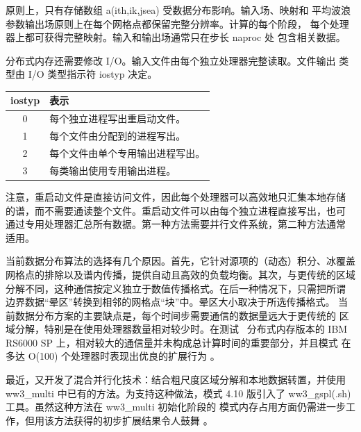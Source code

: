 


原则上，只有存储数组 {\F a(ith,ik,jsea)} 受数据分布影响。输入场、映射和
平均波浪参数输出场原则上在每个网格点都保留完整分辨率。计算的每个阶段，
每个处理器上都可获得完整映射。输入和输出场通常只在步长 {\F naproc} 处
包含相关数据。

分布式内存还需要修改 I/O。输入文件由每个独立处理器完整读取。文件输出
类型由 I/O 类型指示符 {\F iostyp} 决定。

\begin{center} \begin{tabular}{cl}
{\F iostyp} & 表示 \\ \hline
  0 & 每个独立进程写出重启动文件。 \\
  1 & 每个文件由分配到的进程写出。 \\
  2 & 每个文件由单个专用输出进程写出。 \\
  3 & 每类输出使用专用输出进程。
\end{tabular} \end{center}

\noindent
注意，重启动文件是直接访问文件，因此每个处理器可以高效地只汇集本地存储
的谱，而不需要通读整个文件。重启动文件可以由每个独立进程直接写出，也可
通过专用处理器汇总所有数据。第一种方法需要并行文件系统，第二种方法通常
适用。

当前数据分布算法的选择有几个原因。首先，它针对源项的（动态）积分、冰覆盖
网格点的排除以及谱内传播，提供自动且高效的负载均衡。其次，与更传统的区域
分解不同，这种通信按定义独立于数值传播格式。在后一种情况下，只需把所谓
边界数据“晕区”转换到相邻的网格点“块”中。晕区大小取决于所选传播格式。
当前数据分布方案的主要缺点是，每个时间步需要通信的数据量远大于更传统的
区域分解，特别是在使用处理器数量相对较少时。在测试 \ws\ 分布式内存版本的
IBM RS6000 SP 上，相对较大的通信量并未构成总计算时间的重要部分，并且模式
在多达 O(100) 个处理器时表现出优良的扩展行为 \citep{tol:PACO02}。

最近，又开发了混合并行化技术：结合粗尺度区域分解和本地数据转置，并使用
{\file ww3\_multi} 中已有的方法。为支持这种做法，模式 4.10 版引入了
{\file ww3\_gspl(.sh)} 工具。虽然这种方法在 {\file ww3\_multi} 初始化阶段的
模式内存占用方面仍需进一步工作，但用该方法获得的初步扩展结果令人鼓舞
\cite[见][]{tol:MMAB13b}。
